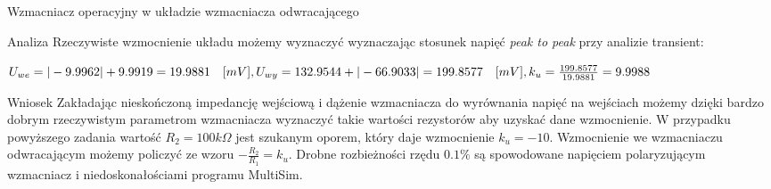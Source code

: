 \documentclass[a4paper]{scrartcl}
\begin{document}
\begin{section}{Wzmacniacz operacyjny w układzie wzmacniacza odwracającego}
\begin{subsection}{Analiza}
				Rzeczywiste wzmocnienie układu możemy wyznaczyć wyznaczając stosunek napięć \textit{peak to peak} przy analizie transient: \\
				\begin{center}
					\begin{math}
					 U_{we} = \vert-9.9962\vert + 9.9919 = 19.9881\quad [mV], \\ 
					 U_{wy} = 132.9544 + \vert-66.9033\vert = 199.8577 \quad [mV],\\
					 k_{u} = \frac{199.8577}{19.9881} = 9.9988 
					\end{math}
				\end{center}
		\end{subsection}
		\begin{subsection}{Wniosek}
			Zakładając nieskończoną impedancję wejściową i dążenie wzmacniacza do wyrównania napięć na wejściach możemy dzięki bardzo dobrym rzeczywistym parametrom wzmacniacza wyznaczyć takie wartości rezystorów aby uzyskać dane wzmocnienie. W przypadku powyższego zadania wartość $ R_{2} = 100k\Omega $ jest szukanym oporem, który daje wzmocnienie $ k_{u} = -10 $. Wzmocnienie we wzmacniaczu odwracającym możemy policzyć ze wzoru $-\frac{R_{2}}{R_{1}} = k_{u} $. Drobne rozbieżności rzędu $0.1 \% $ są spowodowane napięciem polaryzującym wzmacniacz i niedoskonałościami programu MultiSim.
		\end{subsection}
	\end{section}
\end{document}
